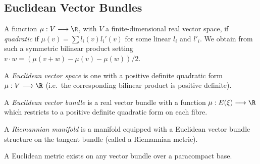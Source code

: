 \documentclass[11pt]{article}
\begin{document}
\subsection*{Euclidean Vector Bundles}
\begin{itemise}
\item A function $\mu:V\to \R$, with $V$ a finite-dimensional real vector space, if \emph{quadratic} if $\mu(v)=\sum l_i(v)l_i'(v)$ for some linear $l_i$ and $l'_i$. We obtain from such a symmetric bilinear product setting $v\cdot w=(\mu(v+w)-\mu(v)-\mu(w))/2$.
\begin{defn*}
A \emph{Euclidean vector space} is one with a positive definite quadratic form $\mu:V\to\R$ (i.e.\ the corresponding bilinear product is positive definite).
\end{defn*}
\begin{defn*}
A \emph{Euclidean vector bundle} is a real vector bundle with a function  $\mu:E(\xi)\to\R$ which restricts to a positive definite quadratic form on each fibre.
\end{defn*}
\begin{defn*}
A \emph{Riemannian manifold} is a manifold equipped with a Euclidean vector bundle structure on the tangent bundle (called a Riemannian metric).
\end{defn*}
\item A Euclidean metric exists on any vector bundle over a paracompact base.
\end{itemise}
\end{document}

